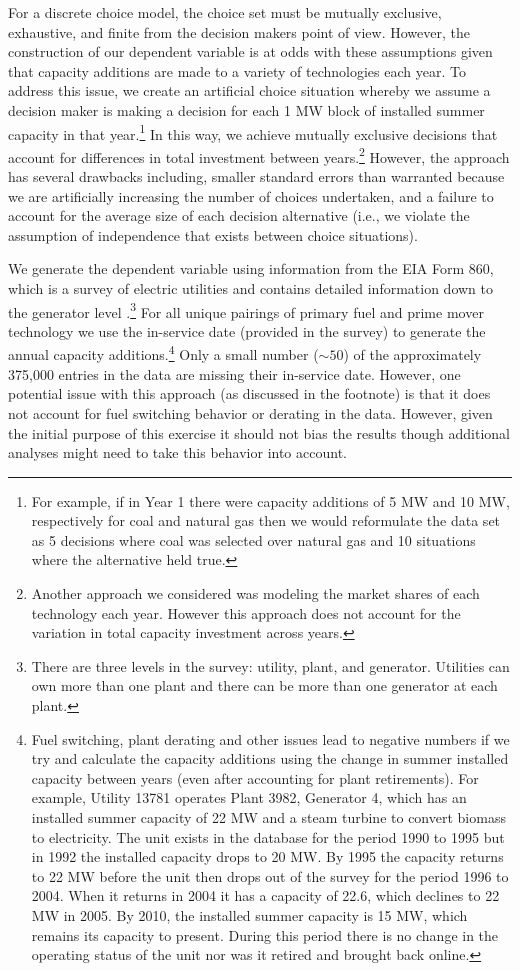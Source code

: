 \documentclass[10pt]{amsart}
\begin{document}
For a discrete choice model, the choice set must be mutually exclusive, exhaustive, and finite from the decision makers point of view. 
However, the construction of our dependent variable is at odds with these assumptions given that capacity additions are made to a variety of technologies each year.
To address this issue, we create an artificial choice situation whereby we assume a decision maker is making a decision for each 1 MW block of installed summer capacity in that year.\footnote{For example, if in Year 1 there were capacity additions of 5 MW and 10 MW, respectively for coal and natural gas then we would reformulate the data set as 5 decisions where coal was selected over natural gas and 10 situations where the alternative held true.}
In this way, we achieve mutually exclusive decisions that account for differences in total investment between years.\footnote{Another approach we considered was modeling the market shares of each technology each year. However this approach does not account for the variation in total capacity investment across years.}
However, the approach has several drawbacks including, smaller standard errors than warranted because we are artificially increasing the number of choices undertaken, and a failure to account for the average size of each decision alternative (i.e., we violate the assumption of independence that exists between choice situations).

We generate the dependent variable using information from the EIA Form 860, which is a survey of electric utilities and contains detailed information down to the generator level \parencite{eiaform860}.\footnote{There are three levels in the survey: utility, plant, and generator. Utilities can own more than one plant and there can be more than one generator at each plant.}
For all unique pairings of primary fuel and prime mover technology we use the in-service date (provided in the survey) to generate the annual capacity additions.\footnote{Fuel switching, plant derating and other issues lead to negative numbers if we try and calculate the capacity additions using the change in summer installed capacity between years (even after accounting for plant retirements). For example, Utility 13781 operates Plant 3982, Generator 4, which has an installed summer capacity of 22 MW and a steam turbine to convert biomass to electricity. The unit exists in the database for the period 1990 to 1995 but in 1992 the installed capacity drops to 20 MW. By 1995 the capacity returns to 22 MW before the unit then drops out of the survey for the period 1996 to 2004. When it returns in 2004 it has a capacity of 22.6, which declines to 22 MW in 2005. By 2010, the installed summer capacity is 15 MW, which remains its capacity to present. During this period there is no change in the operating status of the unit nor was it retired and brought back online.} 
Only a small number ($\sim 50$) of the approximately 375,000 entries in the data are missing their in-service date.
However, one potential issue with this approach (as discussed in the footnote) is that it does not account for fuel switching behavior or derating in the data.
However, given the initial purpose of this exercise it should not bias the results though additional analyses might need to take this behavior into account. 
\end{document}
